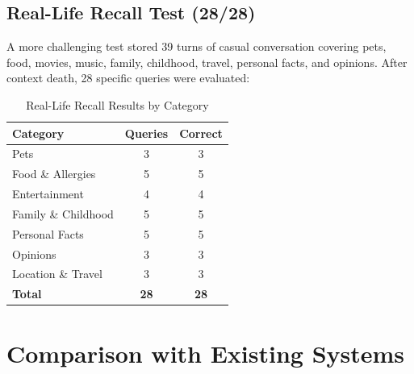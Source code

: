 \documentclass[journal,twoside]{IEEEtran}
\begin{document}
\subsection{Real-Life Recall Test (28/28)}

A more challenging test stored 39 turns of casual conversation covering pets, food, movies, music, family, childhood, travel, personal facts, and opinions. After context death, 28 specific queries were evaluated:

\begin{table}[h]
\centering
\caption{Real-Life Recall Results by Category}
\begin{tabular}{lcc}
\toprule
\textbf{Category} & \textbf{Queries} & \textbf{Correct} \\
\midrule
Pets & 3 & 3 \\
Food \& Allergies & 5 & 5 \\
Entertainment & 4 & 4 \\
Family \& Childhood & 5 & 5 \\
Personal Facts & 5 & 5 \\
Opinions & 3 & 3 \\
Location \& Travel & 3 & 3 \\
\midrule
\textbf{Total} & \textbf{28} & \textbf{28} \\
\bottomrule
\end{tabular}
\label{tab:reallife}
\end{table}

\section{Comparison with Existing Systems}
\end{document}
